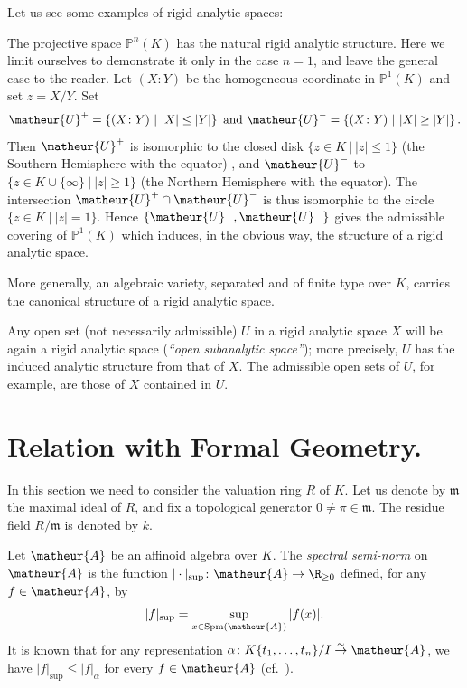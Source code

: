Let us see some examples of rigid analytic spaces:

\begin{appexa}
The projective space $\mathbb{P}^n(K)$ has the natural rigid 
analytic structure.
Here we limit ourselves to demonstrate it only in the case $n=1$, and 
leave the general case to the reader.
Let $(X\colon Y)$ be the homogeneous coordinate in $\mathbb{P}^1(K)$
and set $z=X/Y$.
Set 
$$
\matheur{U}^{+}=\left\{(X\colon Y)\ |\ |X|\leq |Y|\right\}
\ \mathrm{and}\ 
\matheur{U}^{-}=\left\{(X\colon Y)\ |\ |X|\geq |Y|\right\}.
$$
Then $\matheur{U}^{+}$ is isomorphic to the closed disk
$\{z\in K\ |\ |z|\leq 1\}$ (the Southern Hemisphere with the equator)
, and $\matheur{U}^{-}$ to
$\{z\in K\cup\{\infty\}\ |\ |z|\geq 1\}$
(the Northern Hemisphere with the equator).
The intersection $\matheur{U}^{+}\cap\matheur{U}^{-}$ is thus isomorphic to
the circle $\{z\in K\ |\ |z|=1\}$.
Hence $\{\matheur{U}^{+},\matheur{U}^{-}\}$ gives the admissible covering of
$\mathbb{P}^1(K)$ which induces, in the obvious way, the structure
of a rigid analytic space.
\end{appexa}

More generally, an algebraic variety, separated and of finite type
over $K$, carries the canonical structure of a rigid analytic space.

Any open set (not necessarily admissible) $U$ in a rigid analytic 
space $X$ will be again a rigid analytic space ({\it ``open subanalytic
space''}); more precisely, $U$ has the induced analytic structure from 
that of $X$. The admissible open sets of $U$, for example, are those
of $X$ contained in $U$.

%
\section{Relation with Formal Geometry.}
%

In this section we need to consider the valuation ring 
$R$ of $K$. Let us denote by $\mathfrak{m}$ the maximal ideal of $R$, and
fix a topological generator $0\neq\pi\in\mathfrak{m}$.
The residue field $R/\mathfrak{m}$ is denoted by $k$.

Let $\matheur{A}$ be an affinoid algebra over $K$.
The {\it spectral semi-norm} on $\matheur{A}$ is the function
$|\cdot |_{\mathrm{sup}}\colon\matheur{A}\rightarrow\R_{\geq 0}$
defined, for any $f\in\matheur{A}$, by
\begin{equation*}
 |f|_{\mathrm{sup}}=\sup_{x\in\mathrm{Spm}(\matheur{A})}|f(x)|.
\end{equation*}
It is known that for any representation 
$\alpha\colon K\{t_1,\ldots,t_n\}/I\stackrel{\sim}{\rightarrow}\matheur{A}$,
we have $|f|_{\mathrm{sup}}\leq |f|_{\alpha}$ for every $f\in\matheur{A}$
(cf.\ \cite[6.2.1]{na}).

